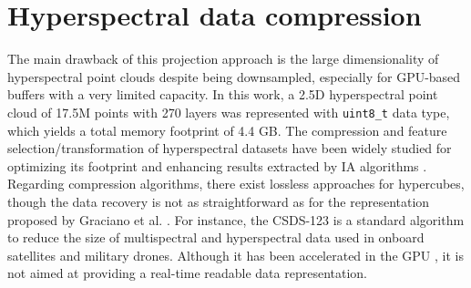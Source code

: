 \section{Hyperspectral data compression}

The main drawback of this projection approach is the large dimensionality of hyperspectral point clouds despite being downsampled, especially for GPU-based buffers with a very limited capacity. In this work, a 2.5D hyperspectral point cloud of 17.5M points with 270 layers was represented with \verb|uint8_t| data type, which yields a total memory footprint of 4.4 GB. The compression and feature selection/transformation of hyperspectral datasets have been widely studied for optimizing its footprint \cite{barrios_shyloc_2020, barrios_performance_2022} and enhancing results extracted by IA algorithms \cite{xuan_early_2022}. Regarding compression algorithms, there exist lossless approaches for hypercubes, though the data recovery is not as straightforward as for the representation proposed by Graciano et al. \cite{graciano_quadstack_2021}. For instance, the CSDS-123 \cite{barrios_shyloc_2020, barrios_performance_2022} is a standard algorithm to reduce the size of multispectral and hyperspectral data used in onboard satellites and military drones. Although it has been accelerated in the GPU \cite{ferraz_hyperspectral_2021}, it is not aimed at providing a real-time readable data representation.

